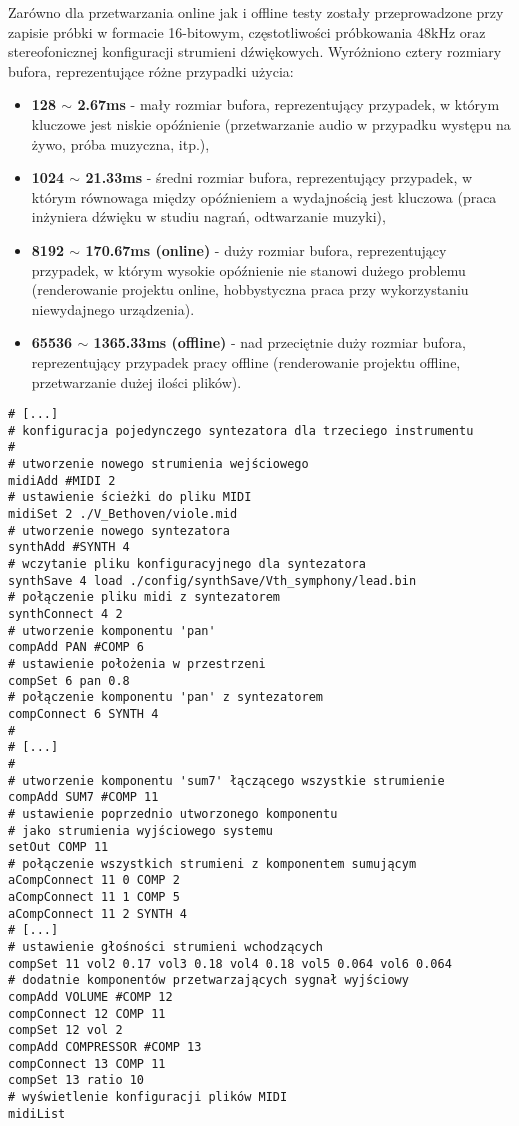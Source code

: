 \vspace{10pt}Zarówno dla przetwarzania online jak i offline testy zostały przeprowadzone przy zapisie próbki w formacie 16-bitowym, częstotliwości próbkowania 48kHz oraz stereofonicznej konfiguracji strumieni dźwiękowych. Wyróżniono cztery rozmiary bufora, reprezentujące różne przypadki użycia:
\begin{itemize}
    \item \textbf{128 $\sim$ 2.67ms} - mały rozmiar bufora, reprezentujący przypadek, w którym kluczowe jest niskie opóźnienie (przetwarzanie audio w przypadku występu na żywo, próba muzyczna, itp.),
    \item \textbf{1024 $\sim$ 21.33ms} - średni rozmiar bufora, reprezentujący przypadek, w którym równowaga między opóźnieniem a wydajnością jest kluczowa (praca inżyniera dźwięku w studiu nagrań, odtwarzanie muzyki),
    \item \textbf{8192 $\sim$ 170.67ms (online)} - duży rozmiar bufora, reprezentujący przypadek, w którym wysokie opóźnienie nie stanowi dużego problemu (renderowanie projektu online, hobbystyczna praca przy wykorzystaniu niewydajnego urządzenia).
    \item \textbf{65536 $\sim$ 1365.33ms (offline)} - nad przeciętnie duży rozmiar bufora, reprezentujący przypadek pracy offline (renderowanie projektu offline, przetwarzanie dużej ilości plików). 
\end{itemize}

\begin{lstlisting}
# [...]
# konfiguracja pojedynczego syntezatora dla trzeciego instrumentu
#
# utworzenie nowego strumienia wejściowego
midiAdd #MIDI 2
# ustawienie ścieżki do pliku MIDI
midiSet 2 ./V_Bethoven/viole.mid
# utworzenie nowego syntezatora
synthAdd #SYNTH 4
# wczytanie pliku konfiguracyjnego dla syntezatora
synthSave 4 load ./config/synthSave/Vth_symphony/lead.bin
# połączenie pliku midi z syntezatorem
synthConnect 4 2
# utworzenie komponentu 'pan'
compAdd PAN #COMP 6
# ustawienie położenia w przestrzeni
compSet 6 pan 0.8
# połączenie komponentu 'pan' z syntezatorem
compConnect 6 SYNTH 4
#
# [...]
#
# utworzenie komponentu 'sum7' łączącego wszystkie strumienie
compAdd SUM7 #COMP 11
# ustawienie poprzednio utworzonego komponentu
# jako strumienia wyjściowego systemu
setOut COMP 11
# połączenie wszystkich strumieni z komponentem sumującym
aCompConnect 11 0 COMP 2
aCompConnect 11 1 COMP 5
aCompConnect 11 2 SYNTH 4
# [...]
# ustawienie głośności strumieni wchodzących
compSet 11 vol2 0.17 vol3 0.18 vol4 0.18 vol5 0.064 vol6 0.064
# dodatnie komponentów przetwarzających sygnał wyjściowy
compAdd VOLUME #COMP 12
compConnect 12 COMP 11
compSet 12 vol 2
compAdd COMPRESSOR #COMP 13
compConnect 13 COMP 11
compSet 13 ratio 10
# wyświetlenie konfiguracji plików MIDI
midiList
\end{lstlisting}

